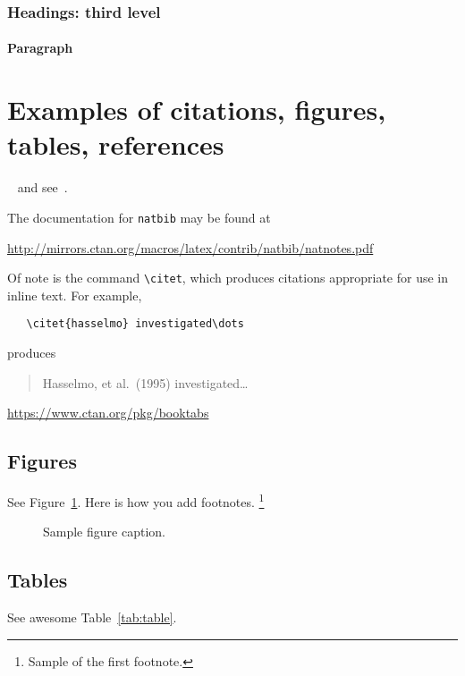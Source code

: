 \documentclass{article}
\begin{document}
  \subsubsection{Headings: third level}
  \lipsum[6]

  \paragraph{Paragraph}
  \lipsum[7]


  \section{Examples of citations, figures, tables, references}
  \label{sec:others}
  \lipsum[8]~\cite{kour2014real,kour2014fast} and see~\cite{hadash2018estimate}.

  The documentation for \verb+natbib+ may be found at
  \begin{center}
    \url{http://mirrors.ctan.org/macros/latex/contrib/natbib/natnotes.pdf}
  \end{center}
  Of note is the command \verb+\citet+, which produces citations
  appropriate for use in inline text. For example,
  \begin{verbatim}
   \citet{hasselmo} investigated\dots
  \end{verbatim}
  produces
  \begin{quote}
    Hasselmo, et al.\ (1995) investigated\dots
  \end{quote}

  \begin{center}
    \url{https://www.ctan.org/pkg/booktabs}
  \end{center}

  \subsection{Figures}
  \label{subsec:figures}
  \lipsum[10]
  See Figure~\ref{fig:fig1}. Here is how you add footnotes. \footnote{Sample of the first footnote.}
  \lipsum[11]

  \begin{figure}
    \centering
    \fbox{\rule[-.5cm]{4cm}{4cm} \rule[-.5cm]{4cm}{0cm}}
    \caption{Sample figure caption.}
    \label{fig:fig1}
  \end{figure}

  \subsection{Tables}
  \label{subsec:tables}
  \lipsum[12]
  See awesome Table~\ref{tab:table}.
\end{document}

